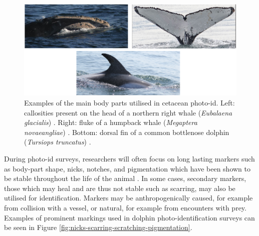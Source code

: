 \begin{figure}
	\begin{center}
		\includegraphics[scale=0.6]{Chapter2/figs/body-part-examples.png}
	\end{center}
	\caption[Examples of the main body parts utilised in cetacean photo-id.]{Examples of the main body parts utilised in cetacean photo-id. Left: callosities present on the head of a northern right whale (\textit{Eubalaena glacialis}) \cite{perrin_encyclopedia_2009}. Right: fluke of a humpback whale (\textit{Megaptera novaeangliae}) \cite{cheeseman_happywhale_2019}. Bottom: dorsal fin of a common bottlenose dolphin (\textit{Tursiops truncatus}) \cite{trotter_ndd20_2020}.
	}
	\label{fig:body-parts}
\end{figure}

During photo-id surveys, researchers will often focus on long lasting markers such as body-part shape, nicks, notches, and pigmentation which have been shown to be stable throughout the life of the animal \cite{wursig_photographic_1977, lockyer_observations_1990, mann_cetacean_2000}. In some cases, secondary markers, those which may heal and are thus not stable such as scarring, may also be utilised for identification. Markers may be anthropogenically caused, for example from collision with a vessel, or natural, for example from encounters with prey. Examples of prominent markings used in dolphin photo-identification surveys can be seen in Figure \ref{fig:nicks-scarring-scratching-pigmentation}.

